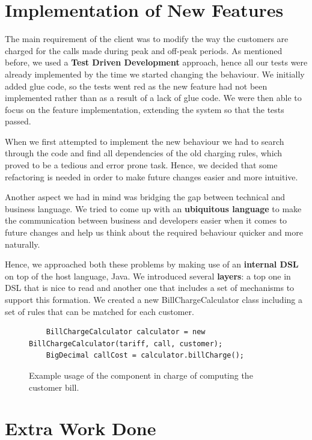 \documentclass[a4paper]{article}
\begin{document}
\section{Implementation of New Features}

The main requirement of the client was to modify the way the customers are charged for the calls made during peak and off-peak periods. As mentioned before, we used a {\bf Test Driven Development} approach, hence all our tests were already implemented by the time we started changing the behaviour. We initially added glue code, so the tests went red as the new feature had not been implemented rather than as a result of a lack of glue code. We were then able to focus on the feature implementation, extending the system so that the tests passed. 

When we first attempted to implement the new behaviour we had to search through the code and find all dependencies of the old charging rules, which proved to be a tedious and error prone task. Hence, we decided that some refactoring is needed in order to make future changes easier and more intuitive.

Another aspect we had in mind was bridging the gap between technical and business language. We tried to come up with an {\bf ubiquitous language} to make the communication between business and developers easier when it comes to future changes and help us think about the required behaviour quicker and more naturally. 

Hence, we approached both these problems by making use of an {\bf internal DSL} on top of the host language, Java. We introduced several {\bf layers}: a top one in DSL that is nice to read and another one that includes a set of mechanisms to support this formation. We created a new BillChargeCalculator class including a set of rules that can be matched for each customer.     

\begin{figure}[H]
\begin{verbatim}
    BillChargeCalculator calculator = new BillChargeCalculator(tariff, call, customer);
    BigDecimal callCost = calculator.billCharge();
\end{verbatim}
\caption{Example usage of the component in charge of computing the customer bill.}
\end{figure}

\section{Extra Work Done}
\end{document}
